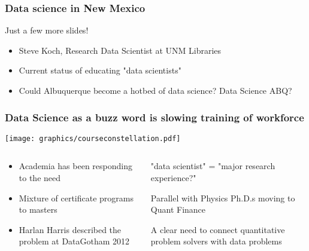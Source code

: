
\begin{frame}
\frametitle{Data science in New Mexico}
\begin{center}

\begin{block}{Just a few more slides!}
\begin{itemize}
    \item Steve Koch, Research Data Scientist at UNM Libraries
	\item Current status of educating "data scientists"
	\item Could Albuquerque become a hotbed of data science? Data Science ABQ? 
\end{itemize}
\end{block}


\end{center}
\end{frame}


\begin{frame}
\frametitle{Data Science as a buzz word is slowing training of workforce}

\begin{center}
\texttt{[image: graphics/courseconstellation.pdf]}

\begin{columns}

\begin{column}{0.5\textwidth}
\begin{center}
\begin{itemize}
    \tiny\item \tiny{Academia has been responding to the need}
    \item \tiny{Mixture of certificate programs to masters}
    \item \tiny{Harlan Harris described the problem at DataGotham 2012}
\end{itemize}
\end{center}
\end{column}

\begin{column}{0.5\textwidth}
\begin{itemize}
    \tiny{\item "data scientist" = "major research experience?"}
    \tiny{\item Parallel with Physics Ph.D.s moving to Quant Finance}
    \tiny{\item A clear need to connect quantitative problem solvers with data problems}
\end{itemize}
\end{column}

\end{columns}

\end{center}

\end{frame}


